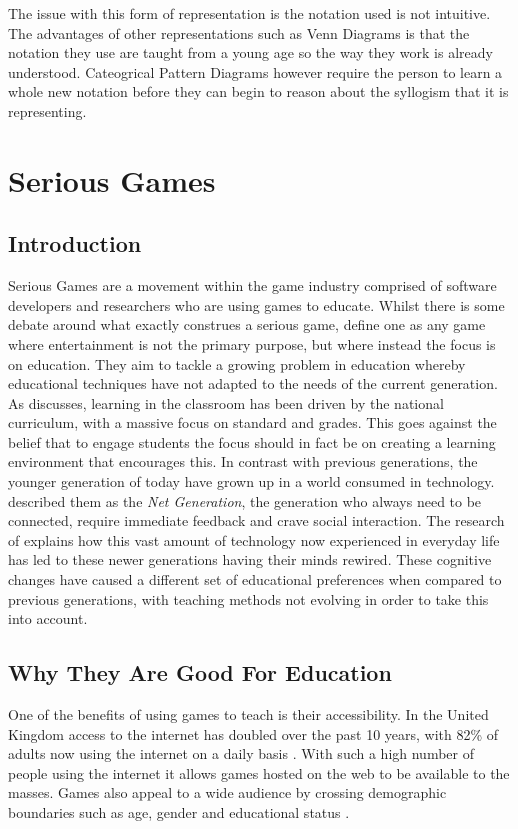 \documentclass[12pt,a4paper]{report}
\begin{document}
The issue with this form of representation is the notation used is not intuitive. The advantages of other representations such as Venn Diagrams is that the notation they use are taught from a young age so the way they work is already understood. Cateogrical Pattern Diagrams however require the person to learn a whole new notation before they can begin to reason about the syllogism that it is representing.

\chapter{Serious Games}
\section{Introduction}
Serious Games are a movement within the game industry comprised of software developers and researchers who are using games to educate. Whilst there is some debate around what exactly construes a serious game, \cite{michael2005serious} define one as any game where entertainment is not the primary purpose, but where instead the focus is on education. They aim to tackle a growing problem in education whereby educational techniques have not adapted to the needs of the current generation. As \citep{Lim} discusses, learning in the classroom has been driven by the national curriculum, with a massive focus on standard and grades. This goes against the belief that to engage students the focus should in fact be on creating a learning environment that encourages this.  In contrast with previous generations, the younger generation of today have grown up in a world consumed in technology. \cite{oblinger2005educating} described them as the \textit{Net Generation}, the generation who always need to be connected, require immediate feedback and crave social interaction. The research of \cite{prensky2001games} explains how this vast amount of technology now experienced in everyday life has led to these newer generations having their minds rewired. These cognitive changes have caused a different set of educational preferences when compared to previous generations, with teaching methods not evolving in order to take this into account.

\section{Why They Are Good For Education}
One of the benefits of using games to teach is their accessibility. In the United Kingdom  access to the internet has doubled over the past 10 years, with 82\% of adults now using the internet on a daily basis \citep{onssurvey}. With such a high number of people using the internet it allows games hosted on the web to be available to the masses. Games also appeal to a wide audience by crossing demographic boundaries such as age, gender and educational status \citep{griffiths2002educational}. 
\end{document}
